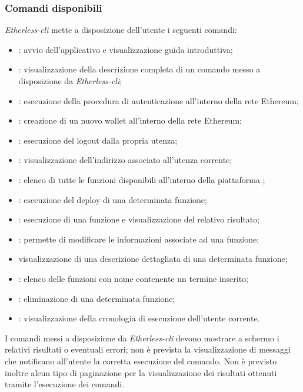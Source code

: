 \subsubsection{Comandi disponibili}
\textit{Etherless-cli} mette a disposizione dell'utente i seguenti comandi: 
\begin{itemize}
	\item \init{}: avvio dell'applicativo e visualizzazione guida introduttiva; 
	\item \help{}: visualizzazione della descrizione completa di un comando messo a disposizione da \textit{Etherless-cli}; 
	\item \login{}: esecuzione della procedura di autenticazione all'interno della rete Ethereum; 
	\item \signup{}: creazione di un nuovo wallet all'interno della rete Ethereum; 
	\item \logout{}: esecuzione del logout dalla propria utenza; 
	\item \whoami{}: visualizzazione dell'indirizzo associato all'utenza corrente; 
	\item \lista{}: elenco di tutte le funzioni disponibili all'interno della piattaforma \NomeProgetto{}; 
	\item \deploy{}: esecuzione del deploy di una determinata funzione;  
	\item \run{}: esecuzione di una funzione e visualizzazione del relativo risultato; 
	\item \edit{}: permette di modificare le informazioni associate ad una funzione; 
	\item \info{} visualizzazione di una descrizione dettagliata di una determinata funzione; 
	\item \search{}: elenco delle funzioni con nome contenente un termine inserito; 
	\item \delete{}: eliminazione di una determinata funzione;
	\item \history{}: visualizzazione della cronologia di esecuzione dell'utente corrente. 
\end{itemize}
I comandi messi a disposizione da \textit{Etherless-cli} devono mostrare a schermo i relativi risultati o eventuali errori; non è prevista la visualizzazione di messaggi che notificano all'utente la corretta esecuzione del comando. Non è previsto inoltre alcun tipo di paginazione per la visualizzazione dei risultati ottenuti tramite l'esecuzione dei comandi.


